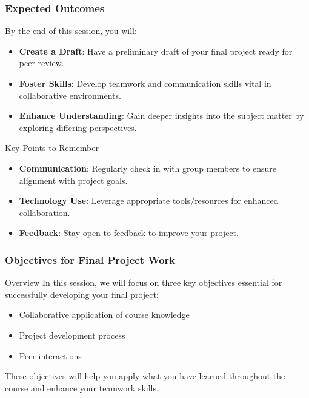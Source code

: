 \documentclass[aspectratio=169]{beamer}
\begin{document}
\begin{frame}[fragile]
    \frametitle{Expected Outcomes}
    By the end of this session, you will:
    \begin{itemize}
        \item \textbf{Create a Draft}: Have a preliminary draft of your final project ready for peer review.
        \item \textbf{Foster Skills}: Develop teamwork and communication skills vital in collaborative environments.
        \item \textbf{Enhance Understanding}: Gain deeper insights into the subject matter by exploring differing perspectives.
    \end{itemize}
    
    \begin{block}{Key Points to Remember}
        \begin{itemize}
            \item \textbf{Communication}: Regularly check in with group members to ensure alignment with project goals.
            \item \textbf{Technology Use}: Leverage appropriate tools/resources for enhanced collaboration.
            \item \textbf{Feedback}: Stay open to feedback to improve your project.
        \end{itemize}
    \end{block}
\end{frame}

\begin{frame}[fragile]
    \frametitle{Objectives for Final Project Work}
    \begin{block}{Overview}
        In this session, we will focus on three key objectives essential for successfully developing your final project:
        \begin{itemize}
            \item Collaborative application of course knowledge
            \item Project development process
            \item Peer interactions
        \end{itemize}
        These objectives will help you apply what you have learned throughout the course and enhance your teamwork skills.
    \end{block}
\end{frame}
\end{document}
